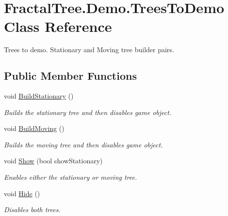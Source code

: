 \hypertarget{class_fractal_tree_1_1_demo_1_1_trees_to_demo}{}\section{Fractal\+Tree.\+Demo.\+Trees\+To\+Demo Class Reference}
\label{class_fractal_tree_1_1_demo_1_1_trees_to_demo}


Trees to demo. Stationary and Moving tree builder pairs.  


\subsection*{Public Member Functions}
\begin{DoxyCompactItemize}
\item 
void \hyperlink{class_fractal_tree_1_1_demo_1_1_trees_to_demo_a619aeb9379dfe3fdd85c881d7d1703e3}{Build\+Stationary} ()
\begin{DoxyCompactList}\small\item\em Builds the stationary tree and then disables game object. \end{DoxyCompactList}\item 
void \hyperlink{class_fractal_tree_1_1_demo_1_1_trees_to_demo_afad82e3ecd0f549ad278cd912050491d}{Build\+Moving} ()
\begin{DoxyCompactList}\small\item\em Builds the moving tree and then disables game object. \end{DoxyCompactList}\item 
void \hyperlink{class_fractal_tree_1_1_demo_1_1_trees_to_demo_abe09f9d37ec9b04f06abd2bef66aed72}{Show} (bool show\+Stationary)
\begin{DoxyCompactList}\small\item\em Enables either the stationary or moving tree. \end{DoxyCompactList}\item 
void \hyperlink{class_fractal_tree_1_1_demo_1_1_trees_to_demo_a9d6e9bb23591884f3bf2a5957095390e}{Hide} ()
\begin{DoxyCompactList}\small\item\em Disables both trees. \end{DoxyCompactList}\end{DoxyCompactItemize}
